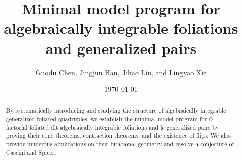 \documentclass[11pt]{amsart}
\numberwithin{equation}{section}
\newcommand{\Qq}{\mathbb{Q}}
\theoremstyle{definition}
\theoremstyle{definition}
\theoremstyle{definition}
\begin{document}
\title{Minimal model program for algebraically integrable foliations and generalized pairs}
\author{Guodu Chen, Jingjun Han, Jihao Liu, and Lingyao Xie}

\date{\today}

\begin{abstract}
By systematically introducing and studying the structure of algebraically integrable generalized foliated quadruples, we establish the minimal model program for $\mathbb Q$-factorial foliated dlt algebraically integrable foliations and lc generalized pairs by proving their cone theorems, contraction theorems, and the existence of flips. We also provide numerous applications on their birational geometry and resolve a conjecture of Cascini and Spicer.
\end{abstract}


\end{document}
